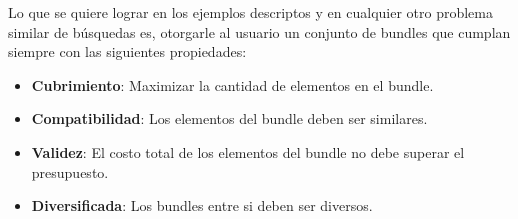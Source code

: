 Lo que se quiere lograr en los ejemplos descriptos y en cualquier otro problema similar de búsquedas es, otorgarle al usuario un conjunto de bundles que cumplan siempre con las siguientes propiedades: 
\begin{itemize}
  \item \textbf{Cubrimiento}: Maximizar la cantidad de elementos en el bundle.
  \item \textbf{Compatibilidad}: Los elementos del bundle deben ser similares.
  \item \textbf{Validez}: El costo total de los elementos del bundle no debe superar el presupuesto.
  \item \textbf{Diversificada}: Los bundles entre si deben ser diversos.
\end{itemize}

